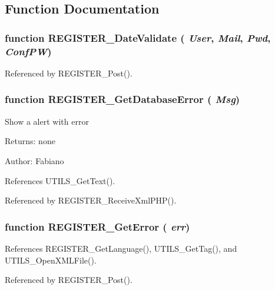 \subsection{Function Documentation}
\subsubsection{\setlength{\rightskip}{0pt plus 5cm}function REGISTER\_\-DateValidate ( {\em User}, \/   {\em Mail}, \/   {\em Pwd}, \/   {\em ConfPW})}\label{register_8js_d13d62f6d4bc07251fde3160659eea8f}




Referenced by REGISTER\_\-Post().
\subsubsection{\setlength{\rightskip}{0pt plus 5cm}function REGISTER\_\-GetDatabaseError ( {\em Msg})}\label{register_8js_6f672d4c31ec61239d0c447e2d909d45}


Show a alert with error \begin{Desc}
\item[Returns:]none\end{Desc}
\begin{Desc}
\item[Author:]Fabiano \end{Desc}


References UTILS\_\-GetText().

Referenced by REGISTER\_\-ReceiveXmlPHP().
\subsubsection{\setlength{\rightskip}{0pt plus 5cm}function REGISTER\_\-GetError ( {\em err})}\label{register_8js_0f784aa2bb5cd6b876e736d01611a1fe}




References REGISTER\_\-GetLanguage(), UTILS\_\-GetTag(), and UTILS\_\-OpenXMLFile().

Referenced by REGISTER\_\-Post().
